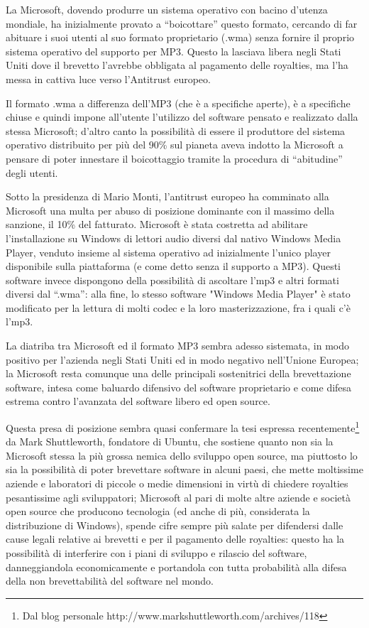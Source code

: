 La Microsoft, dovendo produrre un sistema operativo con bacino d'utenza mondiale, ha inizialmente provato a ``boicottare'' questo formato, cercando di far abituare i suoi utenti al suo formato proprietario (.wma) senza fornire il proprio sistema operativo del supporto per MP3. Questo la lasciava libera negli Stati Uniti dove il brevetto l'avrebbe obbligata al pagamento delle royalties, ma l'ha messa in cattiva luce verso l'Antitrust europeo. 

Il formato .wma a differenza dell'MP3 (che è a specifiche aperte), è a specifiche chiuse e quindi impone all'utente l'utilizzo del software pensato e realizzato dalla stessa Microsoft; d'altro canto la possibilità di essere il produttore del sistema operativo distribuito per più del 90\% sul pianeta aveva indotto la Microsoft a pensare di poter innestare il boicottaggio tramite la procedura di ``abitudine'' degli utenti. 

Sotto la presidenza di Mario Monti, l'antitrust europeo ha comminato alla Microsoft una multa per abuso di posizione dominante con il massimo della sanzione, il 10\% del fatturato. Microsoft è stata costretta ad abilitare l'installazione su Windows di lettori audio diversi dal nativo Windows Media Player, venduto insieme al sistema operativo ad inizialmente l'unico player disponibile sulla piattaforma (e come detto senza il supporto a MP3). Questi software invece dispongono della possibilità di ascoltare l'mp3 e altri formati diversi dal ``.wma'': alla fine, lo stesso software "Windows Media Player" è stato modificato per la lettura di molti codec e la loro masterizzazione, fra i quali c'è l'mp3.

La diatriba tra Microsoft ed il formato MP3 sembra adesso sistemata, in modo positivo per l'azienda negli Stati Uniti ed in modo negativo nell'Unione Europea; la Microsoft resta comunque una delle principali sostenitrici della brevettazione software, intesa come baluardo difensivo del software proprietario e come difesa estrema contro l'avanzata del software libero ed open source. 

Questa presa di posizione sembra quasi confermare la tesi espressa recentemente\footnote{Dal blog personale  http://www.markshuttleworth.com/archives/118} da Mark Shuttleworth, fondatore di Ubuntu, che sostiene quanto non sia la Microsoft stessa la più grossa nemica dello sviluppo open source, ma piuttosto lo sia la possibilità di poter brevettare software in alcuni paesi, che mette moltissime aziende e laboratori di piccole o medie dimensioni in virtù di chiedere royalties pesantissime agli sviluppatori; Microsoft al pari di molte altre aziende e società open source che producono tecnologia (ed anche di più, considerata la distribuzione di Windows), spende cifre sempre più salate per difendersi dalle cause legali relative ai brevetti e per il pagamento delle royalties: questo ha la possibilità di interferire con i piani di sviluppo e rilascio del software, danneggiandola economicamente e portandola con tutta probabilità alla difesa della non brevettabilità del software nel mondo.

